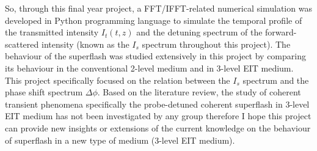So, through this final year project, a FFT/IFFT-related numerical simulation was developed in Python programming language to simulate the temporal profile of the transmitted intensity $I_{t}(t, z)$ and the detuning spectrum of the forward-scattered intensity (known as the $I_{s}$ spectrum throughout this project). The behaviour of the superflash was studied extensively in this project by comparing its behaviour in the conventional 2-level medium and in 3-level EIT medium. This project specifically focused on the relation between the $I_{s}$ spectrum and the phase shift spectrum $\Delta\phi$. Based on the literature review, the study of coherent transient phenomena specifically the probe-detuned coherent superflash in 3-level EIT medium has not been investigated by any group therefore I hope this project can provide new insights or extensions of the current knowledge on the behaviour of superflash in a new type of medium (3-level EIT medium).
